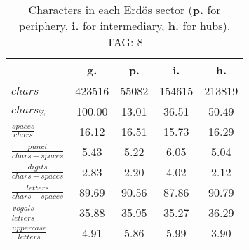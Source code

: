 \begin{table}[h!]
\begin{center}
\begin{tabular}{| l | c | c | c | c |}\hline
 & g. & p. & i. & h. \\\hline
$chars$ & 423516  & 55082  & 154615  & 213819 \\\hline
$chars_{\%}$ & 100.00  & 13.01  & 36.51  & 50.49 \\\hline
$\frac{spaces}{chars}$ & 16.12  & 16.51  & 15.73  & 16.29 \\\hline
$\frac{punct}{chars-spaces}$ & 5.43  & 5.22  & 6.05  & 5.04 \\\hline
$\frac{digits}{chars-spaces}$ & 2.83  & 2.20  & 4.02  & 2.12 \\\hline
$\frac{letters}{chars-spaces}$ & 89.69  & 90.56  & 87.86  & 90.79 \\\hline
$\frac{vogals}{letters}$ & 35.88  & 35.95  & 35.27  & 36.29 \\\hline
$\frac{uppercase}{letters}$ & 4.91  & 5.86  & 5.99  & 3.90 \\\hline
\end{tabular}
\caption{Characters in each Erd\"os sector ({{\bf p.}} for periphery, {{\bf i.}} for intermediary, 
    {{\bf h.}} for hubs). TAG: 8}
\end{center}
\end{table}